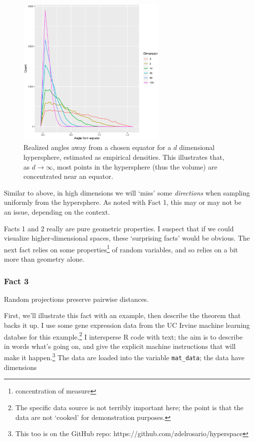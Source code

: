 \documentclass{article}
\begin{document}
\begin{figure}[!ht]
  \centering
  \includegraphics[width=0.65\textwidth]{../../images/equator}
  \caption{Realized angles away from a chosen equator for a $d$ dimensional
    hypersphere, estimated as empirical densities. This illustrates that, as
    $d\to\infty$, most points in the hypersphere (thus the volume) are
    concentrated near an equator.}
  \label{fig:equator}
\end{figure}

Similar to above, in high dimensions we will `miss' some \emph{directions} when
sampling uniformly from the hypersphere. As noted with Fact 1, this may or may
not be an issue, depending on the context.

Facts 1 and 2 really are pure geometric properties. I suspect that if we could
visualize higher-dimensional spaces, these `surprising facts' would be obvious.
The next fact relies on some properties\footnote{concentration of measure} of
random variables, and so relies on a bit more than geometry alone.

\clearpage
\subsubsection{Fact 3}
Random projections preserve pairwise distances.

\bigskip
First, we'll illustrate this fact with an example, then describe the theorem
that backs it up. I use some gene expression data from the UC Irvine machine
learning databse\cite{blake1998uci} for this example.\footnote{The specific data
  source is not terribly important here; the point is that the data are not
  `cooked' for demonstration purposes.} I intersperse R code with text; the aim
is to describe in words what's going on, and give the explicit machine
instructions that will make it happen.\footnote{This too is on the GitHub repo:
  https://github.com/zdelrosario/hyperspace} The data are loaded into the
variable \lstinline{mat_data}; the data have dimensions
\end{document}
